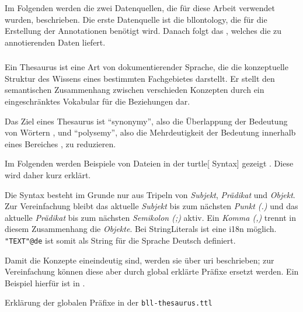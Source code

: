 Im Folgenden werden die zwei Datenquellen,
die für diese Arbeit verwendet wurden,
beschrieben.
Die erste Datenquelle ist die \gls{bllontology},
die für die Erstellung der Annotationen benötigt wird.
Danach folgt das ,
welches die zu annotierenden Daten liefert.

\subsubsection{}


\begin{defn} 
	Ein Thesaurus 
	ist eine Art von dokumentierender
	Sprache,
	die die konzeptuelle Struktur des Wissens eines bestimmten Fachgebietes
	darstellt.
	Er stellt den semantischen Zusammenhang zwischen verschieden Konzepten
	durch ein eingeschränktes Vokabular für die Beziehungen
	dar.
\end{defn}

Das Ziel eines Thesaurus ist \enquote{synonymy},
also die Überlappung der Bedeutung von Wörtern \autocite{oxfordbibliographies:Synonymy},
und \enquote{polysemy},
also die Mehrdeutigkeit der Bedeutung innerhalb eines Bereiches \autocite{oxfordbibliographies:Polysemy},
zu reduzieren.

Im Folgenden werden Beispiele von Dateien in der \gls{turtle}[ Syntax] gezeigt \autocite{w3c:turtle}.
Diese wird daher kurz erklärt.

Die Syntax besteht im Grunde nur aus Tripeln von \emph{Subjekt}, \emph{Prädikat} und \emph{Objekt}.
Zur Vereinfachung bleibt das aktuelle \emph{Subjekt} bis zum nächsten \emph{Punkt (.)}
und das aktuelle \emph{Prädikat} bis zum nächsten \emph{Semikolon (;)} aktiv.
Ein \emph{Komma (,)} trennt in diesem Zusammenhang die \emph{Objekte}.
Bei StringLiterals 
ist eine \gls{i18n}
möglich.
\texttt{"TEXT"@de} ist somit als String für die Sprache Deutsch definiert.

Damit die Konzepte eineindeutig sind,
werden sie über \gls{uri} beschrieben;
zur Vereinfachung können diese aber durch global erklärte Präfixe ersetzt werden.
Ein Beispiel hierfür ist in .

\begin{listing}
	\begin{tcolorbox}[tlistingstyle]
		\inputminted[
			firstline=1,
			lastline=13
		]{turtle}{../data/bll-thesaurus.ttl}
	\end{tcolorbox}
	\caption{Erklärung der globalen Präfixe in der \texttt{bll-thesaurus.ttl}}
	\label{lst:bll:thesaurus:prefixes}
\end{listing}

